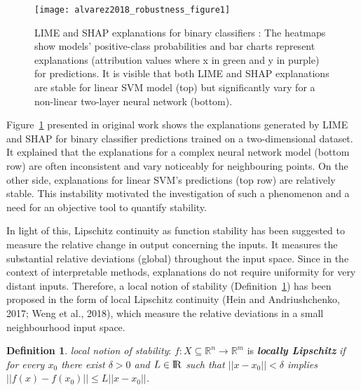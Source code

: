 \documentclass[english]{tktltiki2}
\theoremstyle{definition}
\newtheorem{definition}[thm]{Definition}
\theoremstyle{remark}
\begin{document}

\begin{figure}[H]
	\centering
	\vspace*{-2mm}
	\texttt{[image: alvarez2018\_robustness\_figure1]}
	\vspace*{-10mm}
	\caption{LIME and SHAP explanations for binary classifiers \citep{alvarez2018robustness}: The heatmaps show models’ positive-class probabilities and bar charts represent explanations (attribution values where x in green and y in purple) for predictions. It is visible that both LIME and SHAP explanations are stable for linear SVM model (top) but significantly vary for a non-linear two-layer neural network (bottom).}
	\label{fig:alvarez2018_robustness_figure1}
\end{figure}

Figure~\ref{fig:alvarez2018_robustness_figure1} presented in original work \citep{alvarez2018robustness} shows the explanations generated by LIME \citep{ribeiro2016should} and SHAP \citep{lundberg2017unified} for binary classifier predictions trained on a two-dimensional dataset. It explained that the explanations for a complex neural network model (bottom row) are often inconsistent and vary noticeably for neighbouring points. On the other side, explanations for linear SVM's predictions (top row) are relatively stable. This instability motivated the investigation of such a phenomenon and a need for an objective tool to quantify stability.

In light of this, Lipschitz continuity as function stability has been suggested to measure the relative change in output concerning the inputs. It measures the substantial relative deviations (global) throughout the input space. Since in the context of interpretable methods, explanations do not require uniformity for very distant inputs. Therefore, a local notion of stability (Definition~\ref{def:3}) has been proposed in the form of local Lipschitz continuity (Hein and Andriushchenko, 2017; Weng et al., 2018), which measure the relative deviations in a small neighbourhood input space.
\begin{definition}\label{def:3}{\textit{local notion of stability}:}
	$f: X \subseteq {\mathbb{R}}^n \rightarrow {\mathbb{R}}^m$ is \textbf{\textit{locally Lipschitz}} \textit{if for every $x_0$ there exist $\delta > 0$ and $L \in {\rm I\!R}$ such that $||x - x_0|| < \delta$ implies $||f(x) - f(x_0)|| \leq L||x - x_0||$.}
\end{definition}
\end{document}
